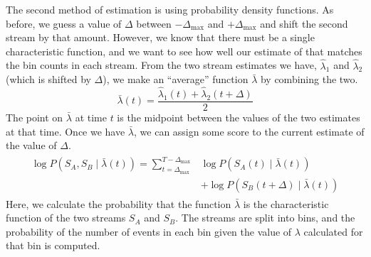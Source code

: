 \documentclass[a4paper,11pt]{article}
\begin{document}
   The second method of estimation is using probability density functions. As
   before, we guess a value of $\Delta$ between $-\Delta_{\text{max}}$ and
   $+\Delta_{\text{max}}$ and shift the second stream by that amount. However, we
   know that there must be a single characteristic function, and we want to see how
   well our estimate of that matches the bin counts in each stream. From the two
   stream estimates we have, $\hat{\lambda}_1$ and $\hat{\lambda}_2$ (which is
   shifted by $\Delta$), we make an ``average'' function $\bar{\lambda}$ by combining the
   two.
   \begin{equation}
   \bar{\lambda}(t)=\frac{\hat{\lambda}_1(t)+\hat{\lambda}_2(t+\Delta)}{2}
   \end{equation}
   The point on $\bar{\lambda}$ at time $t$ is the midpoint between the values of
   the two estimates at that time. Once we have $\bar{\lambda}$, we can assign some
   score to the current estimate of the value of $\Delta$.
   \begin{align}
   \begin{split}
   \log P(S_A,S_B\mid\bar{\lambda}(t))=\sum_{t=\Delta_{\text{max}}}^{T-\Delta_{\text{max}}}&\log P(S_A(t)\mid \bar{\lambda}(t))\\
   &+ \log P(S_B(t+\Delta)\mid \bar{\lambda}(t))
   \end{split}
   \end{align}
   Here, we calculate the probability that the function $\bar{\lambda}$ is the
   characteristic function of the two streams $S_A$ and $S_B$. The streams are
   split into bins, and the probability of the number of events in each bin given
   the value of $\lambda$ calculated for that bin is computed. 
\end{document}
